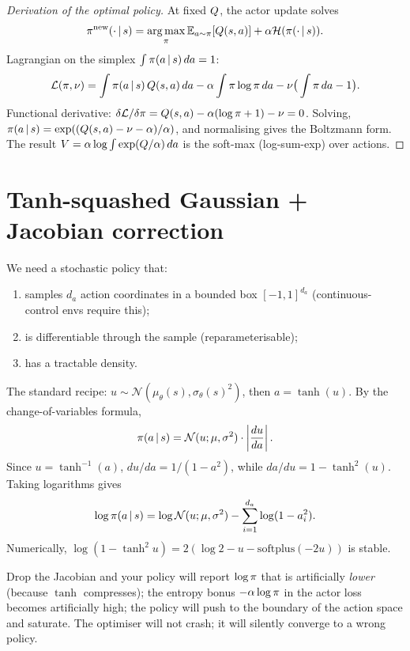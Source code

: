 \documentclass[11pt,oneside]{scrbook}
\begin{document}
\begin{proof}[Derivation of the optimal policy]
At fixed $Q$, the actor update solves
\[
  \pi^\text{new}(\cdot\,\vert\, s) = \operatorname*{arg\,max}_\pi \mathbb{E}_{a\sim\pi}[Q(s,a)] + \alpha \mathcal{H}(\pi(\cdot\,\vert\, s)).
\]
Lagrangian on the simplex $\int \pi(a\,\vert\, s)\, da = 1$:
\[
  \mathcal{L}(\pi, \nu) = \int \pi(a\,\vert\, s)\, Q(s,a)\, da - \alpha \int \pi \log \pi\, da - \nu \big(\int \pi\, da - 1\big).
\]
Functional derivative: $\delta\mathcal{L}/\delta \pi = Q(s,a) - \alpha (\log \pi + 1) - \nu = 0$. Solving, $\pi(a\,\vert\, s) = \exp((Q(s,a) - \nu - \alpha)/\alpha)$, and normalising gives the Boltzmann form. The result $V = \alpha \log \int \exp(Q/\alpha)\, da$ is the soft-max (log-sum-exp) over actions.
\end{proof}

\section{Tanh-squashed Gaussian + Jacobian correction}

We need a stochastic policy that:
\begin{enumerate}[leftmargin=*]
  \item samples $d_a$ action coordinates in a bounded box $[-1, 1]^{d_a}$ (continuous-control envs require this);
  \item is differentiable through the sample (reparameterisable);
  \item has a tractable density.
\end{enumerate}

The standard recipe: $u \sim \mathcal{N}(\mu_\theta(s), \sigma_\theta(s)^2)$, then $a = \tanh(u)$. By the change-of-variables formula,
\[
  \pi(a\,\vert\, s) = \mathcal{N}(u; \mu, \sigma^2) \cdot \left|\frac{du}{da}\right|.
\]
Since $u=\tanh^{-1}(a)$, $du/da=1/(1-a^2)$, while $da/du=1-\tanh^2(u)$. Taking logarithms gives
\[
  \log \pi(a\,\vert\, s) = \log \mathcal{N}(u; \mu, \sigma^2) - \sum_{i=1}^{d_a} \log(1 - a_i^2).
\]
Numerically, $\log(1-\tanh^2 u) = 2(\log 2 - u - \mathrm{softplus}(-2u))$ is stable.

\begin{pitfall}
Drop the Jacobian and your policy will report $\log\pi$ that is artificially \emph{lower} (because $\tanh$ compresses); the entropy bonus $-\alpha \log\pi$ in the actor loss becomes artificially high; the policy will push to the boundary of the action space and saturate. The optimiser will not crash; it will silently converge to a wrong policy.
\end{pitfall}
\end{document}
